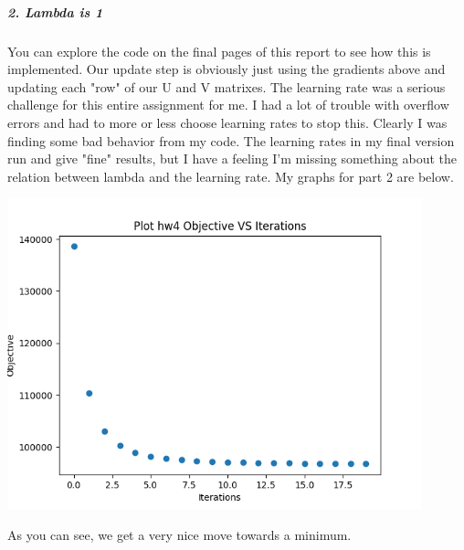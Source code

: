 \documentclass[12pt]{article}
\begin{document}
    \subparagraph{2. Lambda is 1}
    You can explore the code on the final pages of this report to see how this is implemented.
    Our update step is obviously just using the gradients above and updating each "row" of our U and V matrixes.
    The learning rate was a serious challenge for this entire assignment for me. I had a lot of trouble with
    overflow errors and had to more or less choose learning rates to stop this. Clearly I was finding some 
    bad behavior from my code. The learning rates in my final version run and give "fine" results, but I have a feeling
    I'm missing something about the relation between lambda and the learning rate. My graphs for part 2 are below.
    \begin{center}
    \includegraphics[width=12cm]{hw4_part2.png}
    \end{center}
    As you can see, we get a very nice move towards a minimum.
\end{document}

